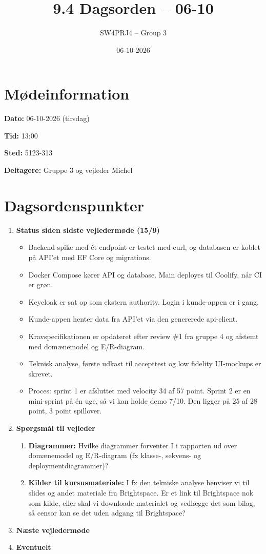 \documentclass[a4paper,11pt]{article}
\title{9.4 Dagsorden -- 06-10}
\author{SW4PRJ4 -- Group 3}
\date{06-10-2026}
\begin{document}
\maketitle

\section*{Mødeinformation}

\textbf{Dato:} 06-10-2026 (tirsdag)

\textbf{Tid:} 13:00

\textbf{Sted:} 5123-313

\textbf{Deltagere:} Gruppe 3 og vejleder Michel

\section*{Dagsordenspunkter}

\begin{enumerate}
    \item \textbf{Status siden sidste vejledermøde (15/9)}
    \begin{itemize}
        \item Backend-spike med ét endpoint er testet med curl, og databasen er koblet på API'et med EF Core og migrations.
        \item Docker Compose kører API og database. Main deployes til Coolify, når CI er grøn.
        \item Keycloak er sat op som ekstern authority. Login i kunde-appen er i gang.
        \item Kunde-appen henter data fra API'et via den genererede api-client.
        \item Kravspecifikationen er opdateret efter review \#1 fra gruppe 4 og afstemt med domænemodel og E/R-diagram.
        \item Teknisk analyse, første udkast til accepttest og low fidelity UI-mockups er skrevet.
        \item Proces: sprint 1 er afsluttet med velocity 34 af 57 point. Sprint 2 er en mini-sprint på én uge, så vi kan holde demo 7/10. Den ligger på 25 af 28 point, 3 point spillover.
    \end{itemize}
    \item \textbf{Spørgsmål til vejleder}
    \begin{enumerate}
        \item \textbf{Diagrammer:} Hvilke diagrammer forventer I i rapporten ud over domænemodel og E/R-diagram (fx klasse-, sekvens- og deploymentdiagrammer)?
        \item \textbf{Kilder til kursusmateriale:} I fx den tekniske analyse henviser vi til slides og andet materiale fra Brightspace. Er et link til Brightspace nok som kilde, eller skal vi downloade materialet og vedlægge det som bilag, så censor kan se det uden adgang til Brightspace?
    \end{enumerate}
    \item \textbf{Næste vejledermøde}
    \item \textbf{Eventuelt}
\end{enumerate}
\end{document}
